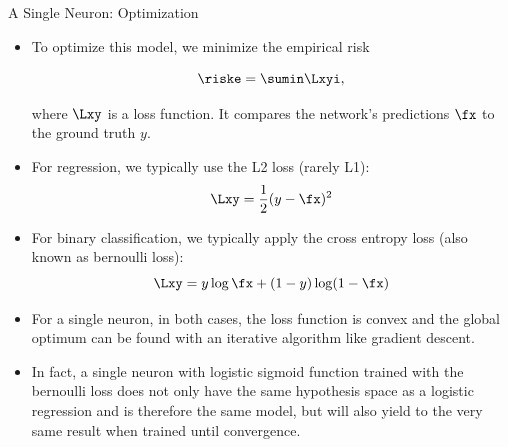 \begin{vbframe} {A Single Neuron: Optimization}
  \begin{itemize}
    \item   
    To optimize this model, we minimize the empirical risk 

    $$
      \riske = \sumin \Lxyi, 
    $$

    where $\Lxy$ is a loss function. It compares the network's predictions $\fx$ to the ground truth $y$. 
    \item For regression, we typically use the L2 loss (rarely L1): $$\Lxy = \frac{1}{2}(y - \fx)^2$$
    \item For binary classification, we typically apply the cross entropy loss (also known as bernoulli loss): 
     $$\Lxy = y \log \fx + (1 - y) \log(1 - \fx)$$
    
    \framebreak 

    \item For a single neuron, in both cases, the loss function is convex and the global optimum can be found with an iterative algorithm like gradient descent. 

    \item In fact, a single neuron with logistic sigmoid function trained with the bernoulli loss does not only have the same hypothesis space as a logistic regression and is therefore the same model, but will also yield to the very same result when trained until convergence.
  \end{itemize}
\end{vbframe} 

\endlecture 
